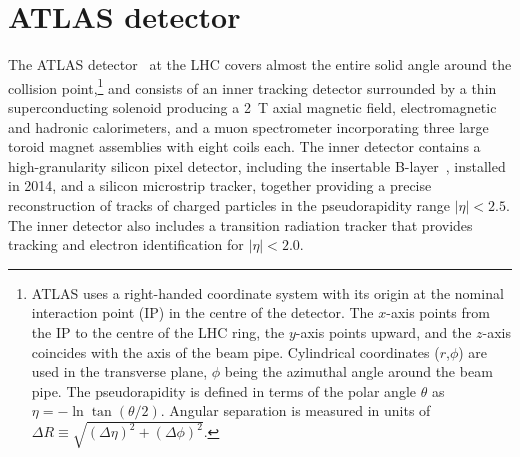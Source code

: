 \documentclass[PAPER, coverpage, atlasdraft=true, texlive=2016, UKenglish]{\ATLASLATEXPATH atlasdoc} %
\begin{document}


\section{ATLAS detector}
\label{sec:detector}

The ATLAS detector~\cite{PERF-2007-01} at the LHC covers almost the entire solid angle around the collision point,\footnote{ATLAS 
uses a right-handed coordinate system with its origin at the nominal interaction point (IP) in the 
centre of the detector.  
The $x$-axis points from
the IP to the centre of the LHC ring, %
the $y$-axis points upward,
and the $z$-axis coincides with the axis of the beam pipe.
Cylindrical coordinates ($r$,$\phi$) are used 
in the transverse plane, $\phi$ being the azimuthal angle around the beam pipe. The pseudorapidity is defined in 
terms of the polar angle $\theta$ as $\eta = - \ln \tan(\theta/2)$.
Angular separation is measured in units of $\Delta R\equiv \sqrt{(\Delta\eta)^2+(\Delta\phi)^2}$.} and consists of an inner tracking detector surrounded by a thin superconducting solenoid producing a
2~T axial magnetic field, electromagnetic and hadronic calorimeters, and a muon spectrometer incorporating three large toroid magnet assemblies with eight coils each. The inner detector contains a high-granularity silicon pixel detector, including the %
insertable B-layer~\cite{IBL1,IBL2,Abbott:2018ikt}, installed in 2014, and a silicon microstrip tracker, together providing a precise reconstruction of tracks of charged particles in the pseudorapidity range $|\eta|<2.5$.
The inner detector also includes a transition radiation tracker that provides tracking and electron identification for $|\eta|<2.0$.
\end{document}
